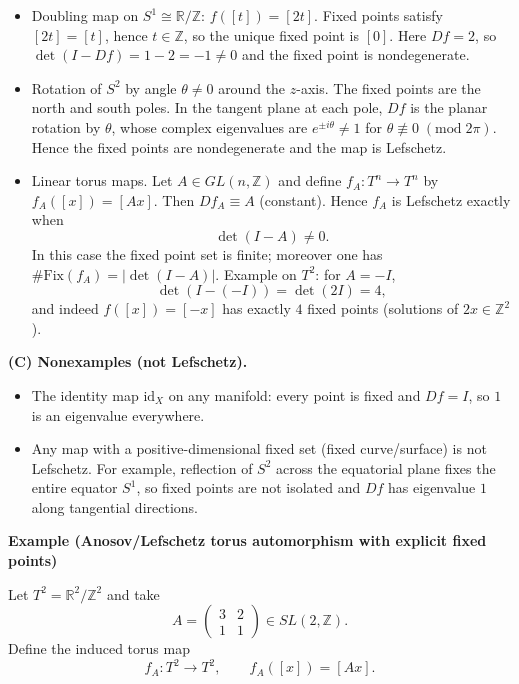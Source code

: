 \begin{solution}
\begin{itemize}
	\item Doubling map on $S^1\cong \mathbb{R}/\mathbb{Z}$: $f([t])=[2t]$.
	Fixed points satisfy $[2t]=[t]$, hence $t\in\mathbb{Z}$, so the unique fixed point is $[0]$.
	Here $Df=2$, so $\det(I-Df)=1-2=-1\neq 0$ and the fixed point is nondegenerate.
	
	\item Rotation of $S^2$ by angle $\theta\neq 0$ around the $z$-axis.
	The fixed points are the north and south poles.
	In the tangent plane at each pole, $Df$ is the planar rotation by $\theta$,
	whose complex eigenvalues are $e^{\pm i\theta}\neq 1$ for $\theta\not\equiv 0\;(\mathrm{mod}\;2\pi)$.
	Hence the fixed points are nondegenerate and the map is Lefschetz.
	
	\item Linear torus maps.
	Let $A\in GL(n,\mathbb{Z})$ and define $f_A:T^n\to T^n$ by $f_A([x])=[Ax]$.
	Then $Df_A\equiv A$ (constant). Hence $f_A$ is Lefschetz exactly when
	\[
	\det(I-A)\neq 0.
	\]
	In this case the fixed point set is finite; moreover one has $\#\mathrm{Fix}(f_A)=|\det(I-A)|$.
	Example on $T^2$: for $A=-I$,
	\[
	\det(I-(-I))=\det(2I)=4,
	\]
	and indeed $f([x])=[-x]$ has exactly $4$ fixed points (solutions of $2x\in\mathbb{Z}^2$).
\end{itemize}

\medskip
\noindent\textbf{(C) Nonexamples (not Lefschetz).}
\begin{itemize}
	\item The identity map $\mathrm{id}_X$ on any manifold: every point is fixed and $Df=I$, so $1$ is an eigenvalue everywhere.
	\item Any map with a positive-dimensional fixed set (fixed curve/surface) is not Lefschetz.
	For example, reflection of $S^2$ across the equatorial plane fixes the entire equator $S^1$,
	so fixed points are not isolated and $Df$ has eigenvalue $1$ along tangential directions.
\end{itemize}


\par\medskip\noindent\textbf{Example (Anosov/Lefschetz torus automorphism with explicit fixed points)}\par\smallskip


Let $T^2=\mathbb{R}^2/\mathbb{Z}^2$ and take
\[
A=\begin{pmatrix}3&2\\1&1\end{pmatrix}\in SL(2,\mathbb{Z}).
\]
Define the induced torus map
\[
f_A:T^2\to T^2,\qquad f_A([x])=[Ax].
\]


\end{solution}

